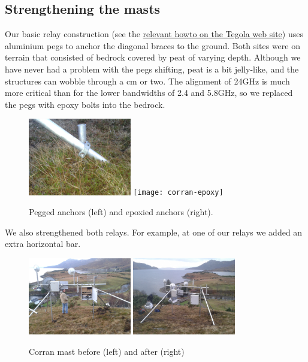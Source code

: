 \documentclass{amsart}
\begin{document}
\subsection{Strengthening the masts}
\label{december-2013-january-2014-strengthening-the-relays}

Our basic relay construction (see the
\href{http://www.tegola.org.uk/howto/relay-construction.html}{relevant
  howto on the Tegola web site}) uses aluminium pegs to anchor the
diagonal braces to the ground. Both sites were on terrain that
consisted of bedrock covered by peat of varying depth. Although we
have never had a problem with the pegs shifting, peat is a bit
jelly-like, and the structures can wobble through a cm or two. The
alignment of 24GHz is much more critical than for the lower bandwidths
of 2.4 and 5.8GHz, so we replaced the pegs with epoxy bolts into the
bedrock.
\begin{figure}[h]
\includegraphics[width=0.4\textwidth]{corran-peg}
\texttt{[image: corran-epoxy]}
\caption{Pegged anchors (left) and epoxied anchors (right).}
\end{figure}

We also strengthened both relays. For example, at one of our relays we
added an extra horizontal bar.

\begin{figure}[h]
\includegraphics[width=0.4\textwidth]{corran-before-from-behind}
\includegraphics[width=0.4\textwidth]{corran-after-from-behind}
\caption{Corran mast before (left) and after (right)}
\end{figure}
\end{document}
